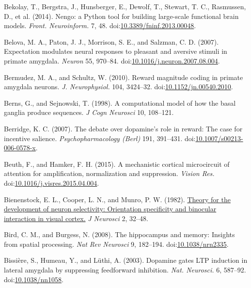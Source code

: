 \documentclass[
  11pt,
  a4paper,
]{scrbook}
\newlength{\cslhangindent}
\newenvironment{CSLReferences}[2] %
 {\begin{list}{}{%
  \setlength{\itemindent}{0pt}
  \setlength{\leftmargin}{0pt}
  \setlength{\parsep}{0pt}
  \ifodd #1
   \setlength{\leftmargin}{\cslhangindent}
   \setlength{\itemindent}{-1\cslhangindent}
  \fi
  \setlength{\itemsep}{#2\baselineskip}}}
 {\end{list}}
\begin{document}
\begin{CSLReferences}{1}{1}
Bekolay, T., Bergstra, J., Hunsberger, E., Dewolf, T., Stewart, T. C.,
Rasmussen, D., et al. (2014). {Nengo: a Python tool for building
large-scale functional brain models.} \emph{Front. Neuroinform.} 7, 48.
doi:\href{https://doi.org/10.3389/fninf.2013.00048}{10.3389/fninf.2013.00048}.

Belova, M. A., Paton, J. J., Morrison, S. E., and Salzman, C. D. (2007).
{Expectation modulates neural responses to pleasant and aversive stimuli
in primate amygdala.} \emph{Neuron} 55, 970--84.
doi:\href{https://doi.org/10.1016/j.neuron.2007.08.004}{10.1016/j.neuron.2007.08.004}.

Bermudez, M. A., and Schultz, W. (2010). {Reward magnitude coding in
primate amygdala neurons.} \emph{J. Neurophysiol.} 104, 3424--32.
doi:\href{https://doi.org/10.1152/jn.00540.2010}{10.1152/jn.00540.2010}.

Berns, G., and Sejnowski, T. (1998). A computational model of how the
basal ganglia produce sequences. \emph{J Cogn Neurosci} 10, 108--121.

Berridge, K. C. (2007). The debate over dopamine's role in reward: The
case for incentive salience. \emph{Psychopharmacology (Berl)} 191,
391--431.
doi:\href{https://doi.org/10.1007/s00213-006-0578-x}{10.1007/s00213-006-0578-x}.

Beuth, F., and Hamker, F. H. (2015). {A mechanistic cortical
microcircuit of attention for amplification, normalization and
suppression.} \emph{Vision Res.}
doi:\href{https://doi.org/10.1016/j.visres.2015.04.004}{10.1016/j.visres.2015.04.004}.

Bienenstock, E. L., Cooper, L. N., and Munro, P. W. (1982).
\href{https://www.ncbi.nlm.nih.gov/pubmed/7054394}{Theory for the
development of neuron selectivity: Orientation specificity and binocular
interaction in visual cortex.} \emph{J Neurosci} 2, 32--48.

Bird, C. M., and Burgess, N. (2008). The hippocampus and memory:
Insights from spatial processing. \emph{Nat Rev Neurosci} 9, 182--194.
doi:\href{https://doi.org/10.1038/nrn2335}{10.1038/nrn2335}.

Bissière, S., Humeau, Y., and Lüthi, A. (2003). {Dopamine gates LTP
induction in lateral amygdala by suppressing feedforward inhibition.}
\emph{Nat. Neurosci.} 6, 587--92.
doi:\href{https://doi.org/10.1038/nn1058}{10.1038/nn1058}.


\end{CSLReferences}
\end{document}
